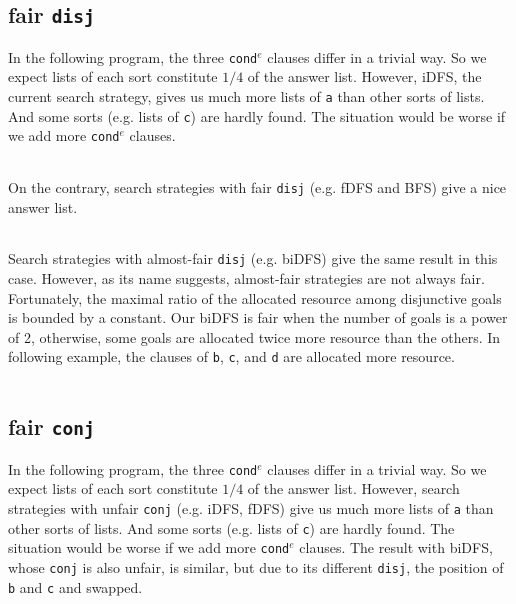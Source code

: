\documentclass[format=acmlarge, review=true, authordraft=true]{acmart}
\newcommand{\conde}{\texttt{cond$^e$} }
\newcommand{\conj}{\texttt{conj}}
\newcommand{\disj}{\texttt{disj}}
\begin{document}
\subsection{fair \texttt{disj}}

In the following program, the three \conde clauses differ in a trivial way. So 
we expect lists of each sort constitute $1/4$ of the answer list. However, 
iDFS, the current search strategy, gives us much more lists of \texttt{a} than 
other sorts of lists. And some sorts (e.g. lists of \texttt{c}) are hardly 
found. The situation would be worse if we add more \conde clauses.

\begin{center}
	\begin{tabular}{c}
		
	\end{tabular}
\end{center}

On the contrary, search strategies with fair \disj{} (e.g. fDFS and BFS) give a 
nice answer list.

\begin{center}
	\begin{tabular}{c}
		
	\end{tabular}
\end{center}

Search strategies with almost-fair \disj{} (e.g. biDFS) give the same result in 
this case. However, as its name suggests, almost-fair strategies are not always 
fair. Fortunately, the maximal ratio of the allocated resource among 
disjunctive goals is bounded by a constant. Our biDFS is fair when the number 
of goals is a power of 2, otherwise, some goals are allocated twice more 
resource than the others. In following example, the clauses of \texttt{b}, 
\texttt{c}, and \texttt{d} are allocated more resource.

\begin{center}
	\begin{tabular}{c}
		
	\end{tabular}
\end{center}

\subsection{fair \texttt{conj}}

In the following program, the three \conde clauses differ in a trivial way. So 
we expect lists of each sort constitute  $1/4$ of the answer list. However, 
search strategies with unfair \conj{} (e.g. iDFS, fDFS) give us much 
more lists of \texttt{a} than other sorts of lists. And some sorts (e.g. lists 
of \texttt{c}) are hardly found. The situation would be worse if we add more 
\conde clauses. The result with biDFS, whose \conj{} is also unfair, is 
similar, but due to its different \disj{}, the position of \texttt{b} and 
\texttt{c} and swapped. 
\end{document}
